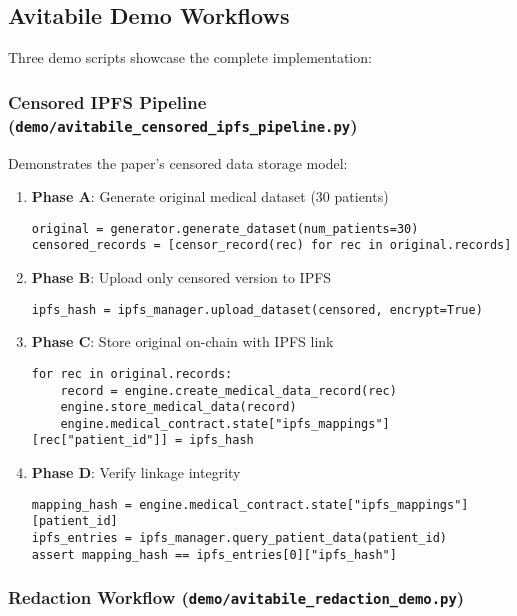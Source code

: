 \subsection{Avitabile Demo Workflows}

Three demo scripts showcase the complete implementation:

\subsubsection{Censored IPFS Pipeline (\texttt{demo/avitabile\_censored\_ipfs\_pipeline.py})}

Demonstrates the paper's censored data storage model:

\begin{enumerate}
    \item \textbf{Phase A}: Generate original medical dataset (30 patients)
    \begin{verbatim}
original = generator.generate_dataset(num_patients=30)
censored_records = [censor_record(rec) for rec in original.records]
\end{verbatim}
    
    \item \textbf{Phase B}: Upload only censored version to IPFS
    \begin{verbatim}
ipfs_hash = ipfs_manager.upload_dataset(censored, encrypt=True)
\end{verbatim}
    
    \item \textbf{Phase C}: Store original on-chain with IPFS link
    \begin{verbatim}
for rec in original.records:
    record = engine.create_medical_data_record(rec)
    engine.store_medical_data(record)
    engine.medical_contract.state["ipfs_mappings"][rec["patient_id"]] = ipfs_hash
\end{verbatim}
    
    \item \textbf{Phase D}: Verify linkage integrity
    \begin{verbatim}
mapping_hash = engine.medical_contract.state["ipfs_mappings"][patient_id]
ipfs_entries = ipfs_manager.query_patient_data(patient_id)
assert mapping_hash == ipfs_entries[0]["ipfs_hash"]
\end{verbatim}
\end{enumerate}

\subsubsection{Redaction Workflow (\texttt{demo/avitabile\_redaction\_demo.py})}

